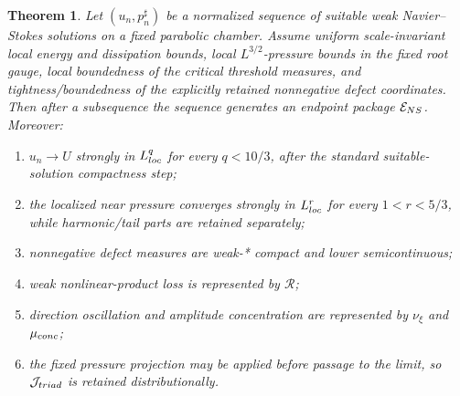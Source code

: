 \documentclass[10pt,a4paper]{amsart}
\newtheorem{theorem}{Theorem}
\begin{document}
\begin{theorem}
Let \((u_n,p_n^\sharp)\) be a normalized sequence of suitable weak
Navier--Stokes solutions on a fixed parabolic chamber.  Assume uniform
scale-invariant local energy and dissipation bounds, local
\(L^{3/2}\)-pressure bounds in the fixed root gauge, local boundedness of the
critical threshold measures, and tightness/boundedness of the explicitly
retained nonnegative defect coordinates.  Then after a subsequence the
sequence generates an endpoint package \(\mathcal E_{\rm NS}\).  Moreover:
\begin{enumerate}[label=(\alph*),leftmargin=*]
\item \(u_n\to U\) strongly in \(L^q_{\rm loc}\) for every
      \(q<10/3\), after the standard suitable-solution compactness step;
\item the localized near pressure converges strongly in \(L^r_{\rm loc}\) for every
      \(1<r<5/3\), while harmonic/tail parts are retained separately;
\item nonnegative defect measures are weak-* compact and lower semicontinuous;
\item weak nonlinear-product loss is represented by \(\mathcal R\);
\item direction oscillation and amplitude concentration are represented by
      \(\nu_\xi\) and \(\mu_{\rm conc}\);
\item the fixed pressure projection may be applied before passage to the limit,
      so \(\mathcal J_{\rm triad}\) is retained distributionally.
\end{enumerate}
\end{theorem}
\end{document}
